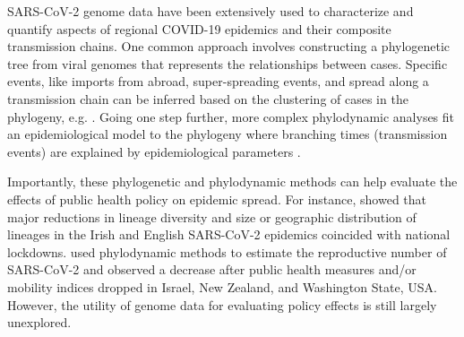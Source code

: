 \documentclass[9pt,twocolumn,twoside,lineno]{pnas-new}
\begin{document}

SARS-CoV-2 genome data have been extensively used to characterize and quantify aspects of regional COVID-19 epidemics and their composite transmission chains. One common approach involves constructing a phylogenetic tree from viral genomes that represents the relationships between cases. Specific events, like imports from abroad, super-spreading events, and spread along a transmission chain can be inferred based on the clustering of cases in the phylogeny, e.g. \cite{Lu2020, Eden2020, OudeMunnink2020, Bluhm2020}. Going one step further, more complex phylodynamic analyses fit an epidemiological model to the phylogeny where branching times (transmission events) are explained by epidemiological parameters \cite{Grenfell2004}.  

Importantly, these phylogenetic and phylodynamic methods can help evaluate the effects of public health policy on epidemic spread. For instance, \cite{Mallon2020, duPlessis2021} showed that major reductions in lineage diversity and size or geographic distribution of lineages in the Irish and English SARS-CoV-2 epidemics coincided with national lockdowns. \cite{Miller2020, Geoghegan2020a, Muller2020a} used phylodynamic methods to estimate the reproductive number of SARS-CoV-2 and observed a decrease after public health measures and/or mobility indices dropped in Israel, New Zealand, and Washington State, USA. However, the utility of genome data for evaluating policy effects is still largely unexplored.
\end{document}

